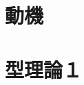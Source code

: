 \documentclass[dvipdfmx]{jsarticle}
\begin{document}
\section{動機}

\newpage

%

%

\section{型理論１}

\newpage

\end{document}
